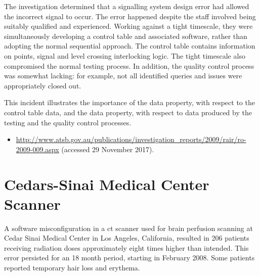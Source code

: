 The investigation determined that a signalling system design error had allowed the incorrect signal to occur. The error happened despite the staff involved being suitably qualified and experienced. Working against a tight timescale, they were simultaneously developing a control table and associated software, rather than adopting the normal sequential approach. The control table contains \gls{information} on points, signal and level crossing interlocking logic. The tight timescale also compromised the normal testing process. In addition, the quality control process was somewhat lacking: for example, not all identified queries and issues were appropriately closed out.

This incident illustrates the importance of the  \gls{data property}, with respect to the control table data, and the  \gls{data property}, with respect to data produced by the testing and the quality control processes.

\begin{samepage}
\begin{itemize}
	\item \raggedright{\href{http://www.atsb.gov.au/publications/investigation_reports/2009/rair/ro-2009-009.aspx}{http://www.atsb.gov.au/publications/investigation\_reports/2009/rair/ro-2009-009.aspx} (accessed 29 November 2017).}
\end{itemize}
\end{samepage}


\section{\protect Cedars-Sinai Medical Center\protect{} Scanner} \label{bkm:incacc:cedarssinai}
A software misconfiguration in a \gls{ct} scanner used for brain perfusion scanning at Cedar Sinai Medical Center in Los Angeles, California, resulted in 206 patients receiving radiation doses approximately eight times higher than intended. This error persisted for an 18 month period, starting in February 2008. Some patients reported temporary hair loss and erythema. 

